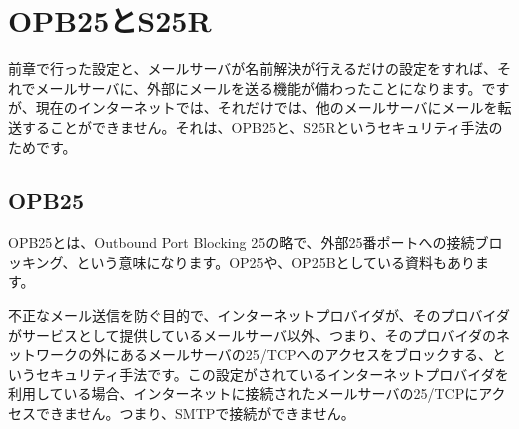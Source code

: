 \section{OPB25とS25R}
前章で行った設定と、メールサーバが名前解決が行えるだけの設定をすれば、それでメールサーバに、外部にメールを送る機能が備わったことになります。ですが、現在のインターネットでは、それだけでは、他のメールサーバにメールを転送することができません。それは、OPB25と、S25Rというセキュリティ手法のためです。

\subsection{OPB25}
OPB25とは、Outbound Port Blocking 25の略で、外部25番ポートへの接続ブロッキング、という意味になります。OP25や、OP25Bとしている資料もあります。

不正なメール送信を防ぐ目的で、インターネットプロバイダが、そのプロバイダがサービスとして提供しているメールサーバ以外、つまり、そのプロバイダのネットワークの外にあるメールサーバの25/TCPへのアクセスをブロックする、というセキュリティ手法です。この設定がされているインターネットプロバイダを利用している場合、インターネットに接続されたメールサーバの25/TCPにアクセスできません。つまり、SMTPで接続ができません。

